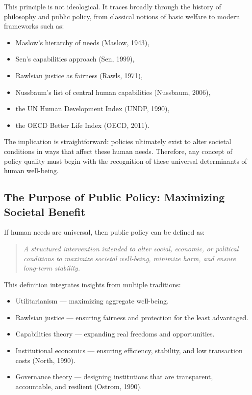 \documentclass[12pt]{article}
\begin{document}
This principle is not ideological. It traces broadly through the history of philosophy and public policy, from classical
notions of basic welfare to modern frameworks such as:

\begin{itemize}
    \item Maslow's hierarchy of needs (Maslow, 1943),
    \item Sen's capabilities approach (Sen, 1999),
    \item Rawlsian justice as fairness (Rawls, 1971),
    \item Nussbaum's list of central human capabilities (Nussbaum, 2006),
    \item the UN Human Development Index (UNDP, 1990),
    \item the OECD Better Life Index (OECD, 2011).
\end{itemize}

The implication is straightforward: policies ultimately exist to alter societal conditions in ways that affect these human
needs. Therefore, any concept of policy quality must begin with the recognition of these universal determinants of human
well-being.

\subsection{The Purpose of Public Policy: Maximizing Societal Benefit}

If human needs are universal, then public policy can be defined as:

\begin{quote}
\textit{A structured intervention intended to alter social, economic, or political conditions to maximize societal
well-being, minimize harm, and ensure long-term stability.}
\end{quote}

This definition integrates insights from multiple traditions:

\begin{itemize}
    \item Utilitarianism --- maximizing aggregate well-being.
    \item Rawlsian justice --- ensuring fairness and protection for the least advantaged.
    \item Capabilities theory --- expanding real freedoms and opportunities.
    \item Institutional economics --- ensuring efficiency, stability, and low transaction costs (North, 1990).
    \item Governance theory --- designing institutions that are transparent, accountable, and resilient (Ostrom, 1990).
\end{itemize}
\end{document}
